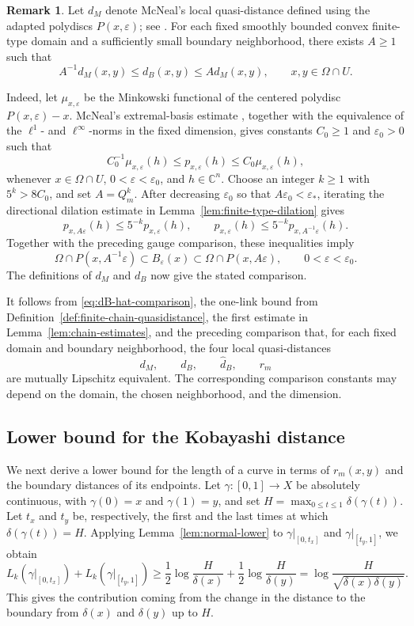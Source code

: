 \documentclass[11pt]{article}
\theoremstyle{definition}
\newtheorem{remark}[theorem]{Remark}
\newcommand{\C}{\mathbb{C}}
\newcommand{\eps}{\varepsilon}
\begin{document}
\begin{remark}
\label{rem:mcneal-comparison}
Let \(d_{M}\) denote McNeal's local quasi-distance defined
using the adapted polydiscs \(P(x,\eps)\); see
\cite[Proposition~5.1]{McNealBergman}.  For each fixed smoothly bounded
convex finite-type domain and a sufficiently small boundary neighborhood,
there exists \(A\ge1\) such that
\[
A^{-1}d_{M}(x,y)
\le d_B(x,y)
\le A d_{M}(x,y),
\qquad x,y\in\Omega\cap U.
\]

Indeed, let \(\mu_{x,\eps}\) be the Minkowski functional of the
centered polydisc \(P(x,\eps)-x\).  McNeal's extremal-basis estimate
\cite[Proposition~2.2]{McNealBergman}, together with the equivalence of
the \(\ell^1\)- and \(\ell^\infty\)-norms in the fixed dimension, gives
constants \(C_0\ge1\) and \(\eps_0>0\) such that
\[
C_0^{-1}\mu_{x,\eps}(h)
\le p_{x,\eps}(h)
\le C_0\mu_{x,\eps}(h),
\]
whenever \(x\in\Omega\cap U\), \(0<\eps<\eps_0\), and \(h\in\C^n\).
Choose an integer \(k\ge1\) with \(5^k>8C_0\), and set
\(A=Q_m^k\).  After decreasing \(\eps_0\) so that
\(A\eps_0<\eps_*\), iterating the directional dilation estimate in
Lemma~\ref{lem:finite-type-dilation} gives
\[
p_{x,A\eps}(h)\le5^{-k}p_{x,\eps}(h),
\qquad
p_{x,\eps}(h)\le5^{-k}p_{x,A^{-1}\eps}(h).
\]
Together with the preceding gauge comparison, these inequalities imply
\[
\Omega\cap P(x,A^{-1}\eps)
\subset
B_\eps(x)
\subset
\Omega\cap P(x,A\eps),
\qquad 0<\eps<\eps_0.
\]
The definitions of \(d_{M}\) and \(d_B\) now give the stated
comparison.

It follows from \eqref{eq:dB-hat-comparison}, the one-link bound from
Definition~\ref{def:finite-chain-quasidistance}, the first estimate in
Lemma~\ref{lem:chain-estimates}, and the preceding comparison that,
for each fixed domain and boundary neighborhood, the four local
quasi-distances
\[
d_{M},\qquad d_B,\qquad \widehat d_B,\qquad r_m
\]
are mutually Lipschitz equivalent.  The corresponding comparison
constants may depend on the domain, the chosen neighborhood, and the
dimension.
\end{remark}

\subsection{Lower bound for the Kobayashi distance}

We next derive a lower bound for the length of a curve in terms of
\(r_m(x,y)\) and the boundary distances of its endpoints.  Let
\(\gamma:[0,1]\to X\) be absolutely continuous, with
\(\gamma(0)=x\) and \(\gamma(1)=y\), and set
\(H=\max_{0\le t\le1}\delta(\gamma(t))\).
Let \(t_x\) and \(t_y\) be, respectively, the first and the last times
at which
\(\delta(\gamma(t))=H\).
Applying Lemma~\ref{lem:normal-lower} to
\(\gamma|_{[0,t_x]}\) and
\(\gamma|_{[t_y,1]}\), we obtain
\[
	L_k(\gamma|_{[0,t_x]})
	+
	L_k(\gamma|_{[t_y,1]})
	\ge
	\frac12\log\frac{H}{\delta(x)}
	+
	\frac12\log\frac{H}{\delta(y)}=
	\log\frac{H}{\sqrt{\delta(x)\delta(y)}}.
\]
This gives the contribution coming from the change in the distance to
the boundary from \(\delta(x)\) and \(\delta(y)\) up to \(H\).
\end{document}
